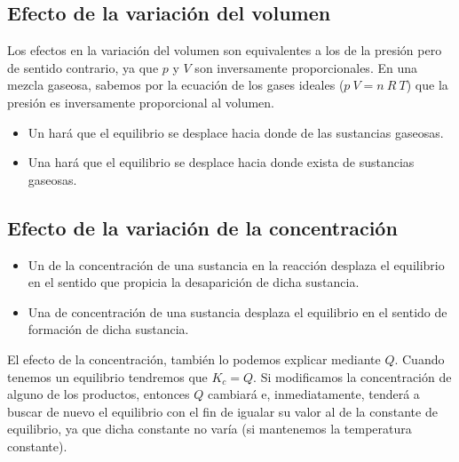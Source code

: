 \subsection{Efecto de la variación del volumen}\label{subsec:efecto-de-la-variacion-del-volumen}

Los efectos en la variación del volumen son equivalentes a los de la presión pero de sentido contrario, ya que \(p\) y \(V\) son inversamente proporcionales.
En una mezcla gaseosa, sabemos por la ecuación de los gases ideales ($p\ V = n\ R\ T$) que la presión es inversamente proporcional al volumen.

\begin{itemize}
    \item Un  hará que el equilibrio se desplace hacia donde  de las sustancias gaseosas.
    \item Una  hará que el equilibrio se desplace hacia donde exista  de sustancias gaseosas.
\end{itemize}

\subsection{Efecto de la variación de la concentración}\label{subsec:efecto-de-la-variacion-de-la-concentracion}
\begin{itemize}
    \item Un  de la concentración de una sustancia  en la reacción desplaza el equilibrio en el sentido que propicia la desaparición de dicha sustancia.
    \item Una  de concentración de una sustancia desplaza el equilibrio en el sentido de formación de dicha sustancia.
\end{itemize}

El efecto de la concentración, también lo podemos explicar mediante \( Q \).
Cuando tenemos un equilibrio tendremos que \( K_c = Q \).
Si modificamos la concentración de alguno de los productos, entonces \( Q \) cambiará e, inmediatamente, tenderá a buscar de nuevo el equilibrio con el fin de igualar su valor al de la constante de equilibrio, ya que dicha constante no varía (si mantenemos la temperatura constante).

